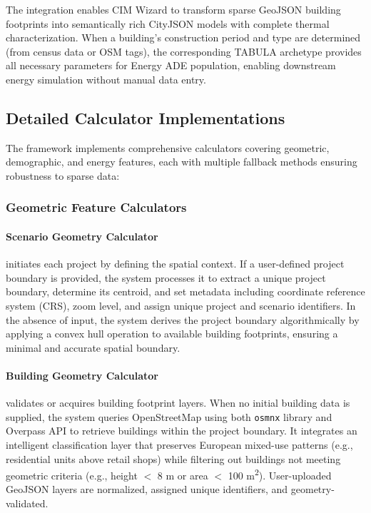 The integration enables CIM Wizard to transform sparse GeoJSON building footprints into semantically rich CityJSON models with complete thermal characterization. When a building's construction period and type are determined (from census data or OSM tags), the corresponding TABULA archetype provides all necessary parameters for Energy ADE population, enabling downstream energy simulation without manual data entry.

\subsection{Detailed Calculator Implementations}

The framework implements comprehensive calculators covering geometric, demographic, and energy features, each with multiple fallback methods ensuring robustness to sparse data:

\subsubsection{Geometric Feature Calculators}

\paragraph{Scenario Geometry Calculator} initiates each project by defining the spatial context. If a user-defined project boundary is provided, the system processes it to extract a unique project boundary, determine its centroid, and set metadata including coordinate reference system (CRS), zoom level, and assign unique project and scenario identifiers. In the absence of input, the system derives the project boundary algorithmically by applying a convex hull operation to available building footprints, ensuring a minimal and accurate spatial boundary.

\paragraph{Building Geometry Calculator} validates or acquires building footprint layers. When no initial building data is supplied, the system queries OpenStreetMap using both \texttt{osmnx} library and Overpass API to retrieve buildings within the project boundary. It integrates an intelligent classification layer that preserves European mixed-use patterns (e.g., residential units above retail shops) while filtering out buildings not meeting geometric criteria (e.g., height $<$ 8 m or area $<$ 100 m\textsuperscript{2}). User-uploaded GeoJSON layers are normalized, assigned unique identifiers, and geometry-validated.

